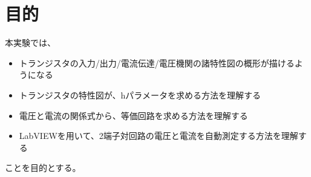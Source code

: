 \documentclass[11pt,dvipdfmx]{jarticle}
\begin{document}
\begin{jikkenTitle}
 \subTitle{} %
 \kyoudou{} %
\end{jikkenTitle}

\section{目的}
本実験では、
\begin{itemize}
	\item トランジスタの入力/出力/電流伝達/電圧機関の諸特性図の概形が描けるようになる
	\item トランジスタの特性図が、hパラメータを求める方法を理解する
	\item 電圧と電流の関係式から、等価回路を求める方法を理解する
	\item LabVIEWを用いて、2端子対回路の電圧と電流を自動測定する方法を理解する
\end{itemize}
ことを目的とする。
\end{document}
